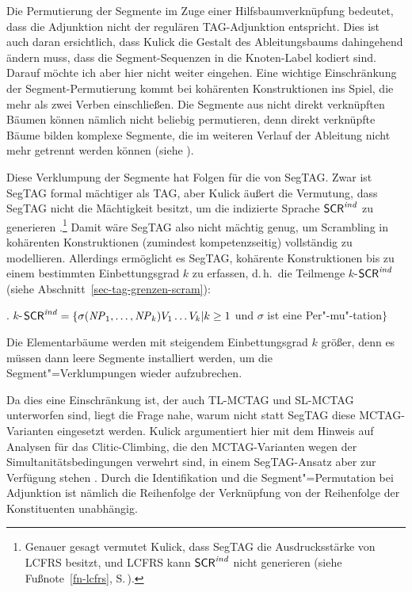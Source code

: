 Die Permutierung der Segmente im Zuge einer Hilfsbaumverknüpfung bedeutet, dass die Adjunktion nicht der regulären TAG-Adjunktion entspricht. Dies ist auch daran ersichtlich, dass Kulick die Gestalt des Ableitungsbaums dahingehend ändern muss, dass die Segment-Sequenzen in die Knoten-Label kodiert sind. Darauf möchte ich aber hier nicht weiter eingehen. Eine wichtige Einschränkung der Segment-Permutierung kommt bei kohärenten Konstruktionen ins Spiel, die mehr als zwei Verben einschlie\ss en. Die Segmente aus nicht direkt verknüpften Bäumen können nämlich nicht beliebig permutieren, denn direkt verknüpfte Bäume bilden komplexe Segmente, die im weiteren Verlauf der Ableitung nicht mehr getrennt werden können (siehe \citealt[213ff]{Kulick:00}).

Diese Verklumpung der Segmente hat Folgen für die  von SegTAG. Zwar ist SegTAG formal mächtiger als TAG, aber Kulick äu\ss ert die Vermutung, dass SegTAG nicht die Mächtigkeit besitzt, um die indizierte Sprache $\mathsf{SCR}^{\mathit{ind}}$ zu generieren \citep[215]{Kulick:00}.\footnote{Genauer gesagt vermutet Kulick, dass SegTAG die Ausdrucksstärke von LCFRS besitzt, und LCFRS kann $\mathsf{SCR}^{\mathit{ind}}$ nicht generieren (siehe Fußnote~\ref{fn-lcfrs}, S.\,\pageref{fn-lcfrs}).} Damit wäre SegTAG also nicht mächtig genug, um Scrambling in kohärenten Konstruktionen (zumindest kompetenzseitig) vollständig zu modellieren. Allerdings ermöglicht es SegTAG, kohärente Konstruktionen bis zu einem bestimmten Einbettungsgrad $k$ zu erfassen, d.\,h.\ die Teilmenge $k$-$\mathsf{SCR}^{\mathit{ind}}$ (siehe Abschnitt~\ref{sec-tag-grenzen-scram}):

\ex. $k$-$\mathsf{SCR}^{\mathit{ind}} = \{ \sigma(\mathit{NP}_1,\ldots,\mathit{NP}_k) V_1 \ldots V_k | k \geq 1$ und $\sigma$ ist eine Per"-mu"-tation$\}$

Die Elementarbäume werden mit steigendem Einbettungsgrad $k$ grö\ss er, denn es müssen dann leere Segmente installiert werden, um die Segment"=Verklumpungen wieder aufzubrechen. 

Da dies eine Einschränkung ist, der auch TL-MCTAG und SL-MCTAG unterworfen sind, liegt die Frage nahe, warum nicht statt SegTAG diese MCTAG-Varianten eingesetzt werden. Kulick argumentiert hier mit dem Hinweis auf Analysen für das Clitic-Climbing, die den MCTAG-Varianten wegen der Simultanitätsbedingungen verwehrt sind, in einem SegTAG-Ansatz aber zur Verfügung stehen \citep[53ff]{Kulick:00}. Durch die Identifikation und die Segment"=Permutation bei Adjunktion ist nämlich die Reihenfolge der Verknüpfung von der Reihenfolge der Konstituenten unabhängig.     

